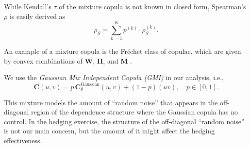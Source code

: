 While Kendall's $\tau$ of the mixture copula is not known in closed form,
Spearman's $\rho$ is easily derived as 
\begin{equation*}
  \rho_S = \sum_{k=1}^K p^{(k)} \cdot \rho_S^{(k)}. 
\end{equation*}




An example of a mixture copula is the Fr\'echet class of copulae, which
are given by convex combinations of $\bm{W}$, $\bm{\Pi}$, and $\bm{M}$
\citep{Nelsen1999}.  

We use the {\em Gaussian Mix Independent Copula (GMI)} in our analysis,
i.e., 
\begin{equation*}
  \bm{C}(u,v) = p\, \bm{C}^\text{Gaussian}_\theta (u,v) + (1-p)(uv),\quad p\in [0,1].
\end{equation*}

This mixture models the amount of ``random noise'' that appears in the
off-diagonal region of the dependence structure where the Gaussian copula has no control.
In the hedging exercise, the structure of the off-diagonal ``random noise'' is not our main concern, 
but the amount of it might affect the hedging effectiveness. 

